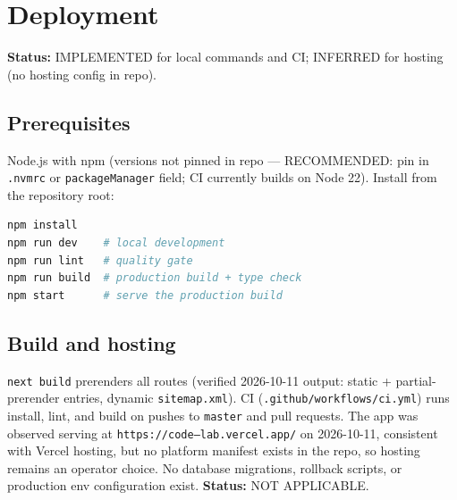 \section{Deployment}
\label{sec:deployment}

\textbf{Status:} IMPLEMENTED for local commands and CI; INFERRED for hosting (no hosting config in repo).

\subsection{Prerequisites}
Node.js with npm (versions not pinned in repo --- RECOMMENDED: pin in \texttt{.nvmrc} or \texttt{packageManager} field; CI currently builds on Node 22). Install from the repository root:

\begin{lstlisting}[language=bash,caption={Verified commands (from package.json scripts)}]
npm install
npm run dev    # local development
npm run lint   # quality gate
npm run build  # production build + type check
npm start      # serve the production build
\end{lstlisting}

\subsection{Build and hosting}
\texttt{next build} prerenders all routes (verified 2026-10-11 output: static + partial-prerender entries, dynamic \texttt{sitemap.xml}). CI (\texttt{.github/workflows/ci.yml}) runs install, lint, and build on pushes to \texttt{master} and pull requests. The app was observed serving at \texttt{https://code--lab.vercel.app/} on 2026-10-11, consistent with Vercel hosting, but no platform manifest exists in the repo, so hosting remains an operator choice. No database migrations, rollback scripts, or production env configuration exist. \textbf{Status:} NOT APPLICABLE.
